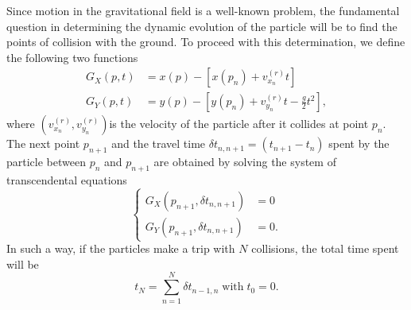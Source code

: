 \documentclass[reprint, aps, pre,nofootinbib]{revtex4-1}
\begin{document}
Since motion in the gravitational field is a well-known problem, the
fundamental question in determining the dynamic evolution of the particle
will be to find the points of collision with the ground. To proceed
with this determination, we define the following two functions
\begin{equation}
\begin{split}G_{X}(p,t) & =x\left(p\right)-\left[x\left(p_{n}\right)+v_{x_{n}}^{(r)}t\right]\\
G_{Y}(p,t) & =y\left(p\right)-\left[y\left(p_{n}\right)+v_{y_{n}}^{(r)}t-\frac{g}{2}t^{2}\right],
\end{split}
\label{colideXY}
\end{equation}
where $\left(v_{x_{n}}^{(r)},v_{y_{n}}^{(r)}\right)$is the velocity
of the particle after it collides at point $p_{n}$. The next point
$p_{n+1}$ and the travel time $\delta t_{n,n+1}=(t_{n+1}-t_{n})$
spent by the particle between $p_{n}$ and $p_{n+1}$ are obtained
by solving the system of transcendental equations
\begin{equation}
\left\{ \begin{split}G_{X}(p_{n+1},\delta t_{n,n+1}) & =0\\
G_{Y}(p_{n+1},\delta t_{n,n+1}) & =0.
\end{split}
\right.\label{system}
\end{equation}
 In such a way, if the particles make a trip with $N$ collisions,
the total time spent will be
\begin{equation}
t_{N}=\sum_{n=1}^{N}\delta t_{n-1,n}\;\textrm{with}\;t_{0}=0.\label{tmax}
\end{equation}
\end{document}
